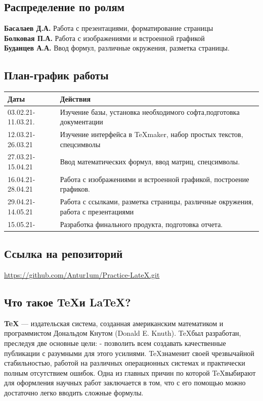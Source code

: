 \documentclass[14pt, a4paper]{extarticle}
\begin{document}
\subsection{Распределение по ролям}
\textbf{Басалаев Д.А.} Работа с презентациями, форматирование страницы\\
\textbf{Болковая П.А.} Работа с изображениями и встроенной графикой\\
\textbf{Буданцев А.А.} Ввод формул, различные окружения, разметка страницы.
\subsection{План-график работы}
\begin{tabular}{| l| p{13cm}|}
\hline {\bfseries \large Даты} & {\bfseries \large Действия}\\ \hline
03.02.21-11.03.21. & Изучение базы, установка необходимого софта,подготовка документации\\ \hline
12.03.21-26.03.21 & Изучение интерфейса в \TeX maker, набор простых текстов, спецсимволы \\ \hline
27.03.21-15.04.21 & Ввод математических формул, ввод матриц, спецсимволы.  \\ \hline
16.04.21-28.04.21 & Работа с изображениями и встроенной графикой, построение графиков. \\ \hline 
29.04.21-14.05.21 & Работа с ссылками, разметка страницы, различные окружения, работа с презентациями \\ \hline
15.05.21- & Разработка финального продукта, подготовка отчета. \\ \hline
\end{tabular}
\subsection{Ссылка на репозиторий}
\url{https://github.com/Antur1um/Practice-LateX.git}
\subsection{Что такое \TeX и \LaTeX ?}
\textbf{\TeX} — издательская система, созданная американским математиком и программистом Дональдом Кнутом (Donald E. Knuth). \TeX был разработан, преследуя две основные цели: - позволить всем создавать качественные публикации с разумными для этого усилиями. \TeX знаменит своей чрезвычайной стабильностью, работой на различных операционных системах и практически полным отсутствием ошибок. Одна из главных причин по которой \TeX выбирают для оформления научных работ заключается в том, что с его помощью можно достаточно легко вводить сложные формулы.\\
\end{document}
